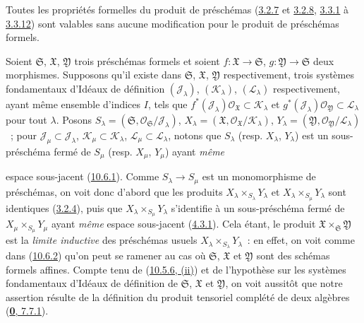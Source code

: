 Toutes les propriétés formelles du produit de préschémas
(\hyperref[I.3.2.7-fr]{3.2.7} et
\hyperref[I.3.2.8-fr]{3.2.8},
\hyperref[I.3.3.1-fr]{3.3.1} à
\hyperref[I.3.3.12-fr]{3.3.12}) sont valables sans aucune modification
pour le produit de préschémas formels.

\begin{env}[10.7.4]
\label{I.10.7.4-fr}
Soient $\mathfrak{S}$, $\mathfrak{X}$, $\mathfrak{Y}$ trois préschémas
formels et soient $f:\mathfrak{X}\to\mathfrak{S}$,
$g:\mathfrak{Y}\to\mathfrak{S}$ deux morphismes. Supposons qu'il existe
dans $\mathfrak{S}$, $\mathfrak{X}$, $\mathfrak{Y}$ respectivement,
trois systèmes fondamentaux d'Idéaux de définition
$(\mathscr{J}_\lambda)$, $(\mathscr{K}_\lambda)$,
$(\mathscr{L}_\lambda)$ respectivement, ayant même ensemble d'indices
$I$, tels que
$f^*(\mathscr{J}_\lambda)\mathscr{O}_{\mathfrak{X}}
\subset\mathscr{K}_\lambda$ et
$g^*(\mathscr{J}_\lambda)\mathscr{O}_{\mathfrak{Y}}
\subset\mathscr{L}_\lambda$ pour tout $\lambda$. Posons
$S_\lambda=(\mathfrak{S},
\mathscr{O}_{\mathfrak{S}}/\mathscr{J}_\lambda)$,
$X_\lambda=(\mathfrak{X},
\mathscr{O}_{\mathfrak{X}}/\mathscr{K}_\lambda)$,
$Y_\lambda=(\mathfrak{Y},
\mathscr{O}_{\mathfrak{Y}}/\mathscr{L}_\lambda)$~; pour
$\mathscr{J}_\mu\subset\mathscr{J}_\lambda$,
$\mathscr{K}_\mu\subset\mathscr{K}_\lambda$,
$\mathscr{L}_\mu\subset\mathscr{L}_\lambda$, notons que
$S_\lambda$ (resp. $X_\lambda$, $Y_\lambda$) est un sous-préschéma fermé
de $S_\mu$ (resp. $X_\mu$, $Y_\mu$) ayant \emph{même}


espace sous-jacent (\hyperref[I.10.6.1-fr]{10.6.1}). Comme
$S_\lambda\to S_\mu$ est un monomorphisme de préschémas, on voit donc
d'abord que les produits
$X_\lambda\times_{S_\lambda}Y_\lambda$ et
$X_\lambda\times_{S_\mu}Y_\lambda$ sont identiques
(\hyperref[I.3.2.4-fr]{3.2.4}), puis que
$X_\lambda\times_{S_\mu}Y_\lambda$ s'identifie à un sous-préschéma fermé
de $X_\mu\times_{S_\mu}Y_\mu$ ayant \emph{même} espace sous-jacent
(\hyperref[I.4.3.1-fr]{4.3.1}). Cela étant, le produit
$\mathfrak{X}\times_{\mathfrak{S}}\mathfrak{Y}$ est la
\emph{limite inductive} des préschémas usuels
$X_\lambda\times_{S_\lambda}Y_\lambda$~: en effet, on voit comme dans
(\hyperref[I.10.6.2-fr]{10.6.2}) qu'on peut se ramener au cas où
$\mathfrak{S}$, $\mathfrak{X}$ et $\mathfrak{Y}$ sont des schémas formels
affines. Compte tenu de (\hyperref[I.10.5.6-fr]{10.5.6, (ii)}) et de
l'hypothèse sur les systèmes fondamentaux d'Idéaux de définition de
$\mathfrak{S}$, $\mathfrak{X}$ et $\mathfrak{Y}$, on voit aussitôt que
notre assertion résulte de la définition du produit tensoriel complété de
deux algèbres (\hyperref[0.7.7.1-fr]{\textbf{0}, 7.7.1}).


\end{env}
